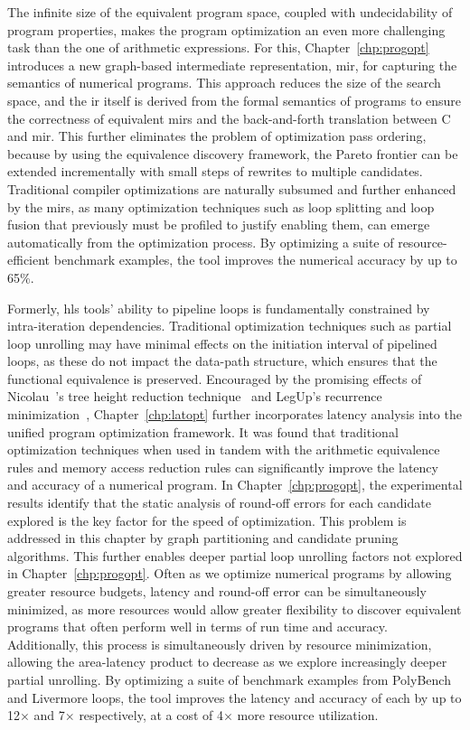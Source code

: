 The infinite size of the equivalent program space, coupled with undecidability
of program properties, makes the program optimization an even more
challenging task than the one of arithmetic expressions.  For this,
Chapter~\ref{chp:progopt} introduces a new graph-based intermediate
representation, \gls{mir}, for capturing the semantics of numerical programs.
This approach reduces the size of the search space, and the \gls{ir} itself
is derived from the formal semantics of programs to ensure the correctness
of equivalent \glspl{mir} and the back-and-forth translation between C and
\gls{mir}\@.  This further eliminates the problem of optimization pass
ordering, because by using the equivalence discovery framework, the Pareto
frontier can be extended incrementally with small steps of rewrites to multiple
candidates.  Traditional compiler optimizations are naturally subsumed and
further enhanced by the \glspl{mir}, as many optimization techniques such as
loop splitting and loop fusion that previously must be profiled to justify
enabling them, can emerge automatically from the optimization process.  By
optimizing a suite of resource-efficient benchmark examples, the tool improves
the numerical accuracy by up to 65\%.

Formerly, \gls{hls} tools' ability to pipeline loops is fundamentally
constrained by intra-iteration dependencies.  Traditional optimization
techniques such as partial loop unrolling may have minimal effects on the
initiation interval of pipelined loops, as these do not impact the data-path
structure, which ensures that the functional equivalence is preserved.
Encouraged by the promising effects of Nicolau~\etal's tree height reduction
technique~\cite{nicolau91} and LegUp's recurrence minimization~\cite{canis14},
Chapter~\ref{chp:latopt} further incorporates latency analysis into the unified
program optimization framework.  It was found that traditional optimization
techniques when used in tandem with the arithmetic equivalence rules and memory
access reduction rules can significantly improve the latency and accuracy of
a numerical program.  In Chapter~\ref{chp:progopt}, the experimental results
identify that the static analysis of round-off errors for each candidate
explored is the key factor for the speed of optimization.  This problem
is addressed in this chapter by graph partitioning and candidate pruning
algorithms.  This further enables deeper partial loop unrolling factors not
explored in Chapter~\ref{chp:progopt}.  Often as we optimize numerical programs
by allowing greater resource budgets, latency and round-off error can be
simultaneously minimized, as more resources would allow greater flexibility
to discover equivalent programs that often perform well in terms of run time
and accuracy.  Additionally, this process is simultaneously driven by resource
minimization, allowing the area-latency product to decrease as we explore
increasingly deeper partial unrolling.  By optimizing a suite of benchmark
examples from PolyBench and Livermore loops, the tool improves the latency and
accuracy of each by up to 12$\times$ and 7$\times$ respectively, at a cost of
4$\times$ more resource utilization.


